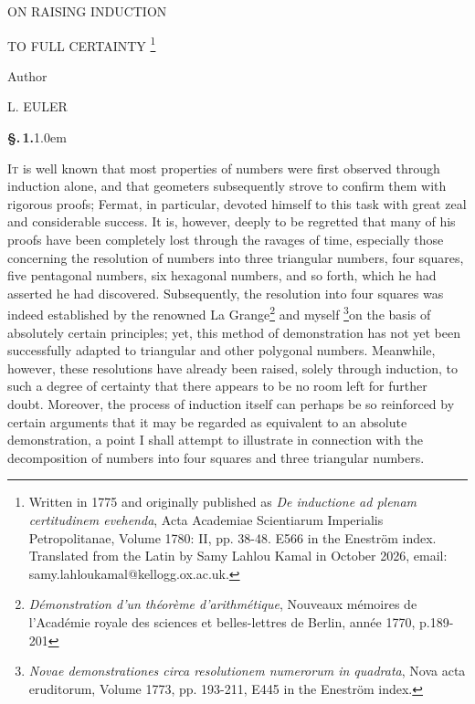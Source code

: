 \documentclass[12pt]{article}
\newcommand{\worktitle}[1]{{\centering\Large{#1}\par}\vspace{.45ex}}
\newcommand{\workbig}[1]{{\centering\LARGE{#1}\par}\vspace{.45ex}}
\newcommand{\worksub}[1]{{\centering\large{#1}\par}\vspace{.45ex}}
\newcommand{\heading}[1]{%
  \par\addvspace{2.0ex plus .5ex minus .3ex}%
  {\centering\large #1\par}%
  \addvspace{1.0ex plus .3ex minus .2ex}}
\newcommand{\pnum}[1]{\textbf{\S.\,#1.}\kern1.0em}
\newcommand{\origpage}[1]{\clearpage\setcounter{page}{#1}}
\begin{document}
\origpage{1}

\vspace*{0cm}
\workbig{ON RAISING INDUCTION}
\worktitle{TO FULL CERTAINTY \footnote{Written in 1775 and originally published as \textit{De inductione ad plenam certitudinem evehenda}, Acta Academiae Scientiarum Imperialis Petropolitanae, Volume 1780: II, pp. 38-48. E566 in the Eneström index. Translated from the Latin by Samy Lahlou Kamal in October 2026, email: samy.lahloukamal@kellogg.ox.ac.uk.}}
\vspace{0.7cm}
\worksub{Author}
\worktitle{L. EULER}
\vspace{0.7cm}


\heading{\pnum{1}}

\lettrine[lines=2,findent=.15em,nindent=0pt]{I}{t} is well known that most properties of numbers were first observed through induction alone, and that geometers subsequently strove to confirm them with rigorous proofs; Fermat, in particular, devoted himself to this task with great zeal and considerable success. It is, however, deeply to be regretted that many of his proofs have been completely lost through the ravages of time, especially those concerning the resolution of numbers into three triangular numbers, four squares, five pentagonal numbers, six hexagonal numbers, and so forth, which he had asserted he had discovered. Subsequently, the resolution into four squares was indeed established by the renowned La Grange\footnote{\textit{Démonstration d'un théorème d'arithmétique}, Nouveaux mémoires de l'Académie royale des sciences et belles-lettres de Berlin, année 1770, p.189-201} and myself \footnote{\textit{Novae demonstrationes circa resolutionem numerorum in quadrata}, Nova acta eruditorum, Volume 1773, pp. 193-211, E445 in the Eneström index.}on the basis of absolutely certain principles; yet, this method of demonstration has not yet been successfully adapted to triangular and other polygonal numbers. Meanwhile, however, these resolutions have already been raised, solely through induction, to such a degree of certainty that there appears to be no room left for further doubt. Moreover, the process of induction itself can perhaps be so reinforced by certain arguments that it may be regarded as equivalent to an absolute demonstration, a point I shall attempt to illustrate in connection with the decomposition of numbers into four squares and three triangular numbers.\\
\end{document}
